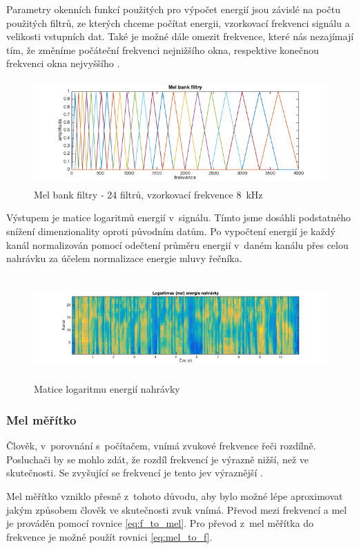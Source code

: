 Parametry okenních funkcí použitých pro výpočet energií jsou závislé na počtu použitých filtrů, ze kterých chceme počítat energii, vzorkovací frekvenci signálu a velikosti vstupních dat. Také je možné dále omezit frekvence, které nás nezajímají tím, že změníme počáteční frekvenci nejnižšího okna, respektive konečnou frekvenci okna nejvyššího
.
\begin{figure}[H]
	\centering
		\includegraphics[height=4cm]{obrazky-figures/mel_bank_filters.png}
        \caption{Mel bank filtry - 24 filtrů, vzorkovací frekvence 8~kHz}
\end{figure}

Výstupem je matice logaritmů energií v~signálu. Tímto jsme dosáhli podstatného snížení dimenzionality oproti původním datům. Po vypočtení energií je každý kanál normalizován pomocí odečtení průměru energií v~daném kanálu přes celou nahrávku za účelem normalizace energie mluvy řečníka.

\begin{figure}[H]
	\centering
		\includegraphics[height=4cm]{obrazky-figures/log_mel_power.png}
        \caption{Matice logaritmu energií nahrávky}
\end{figure}

\subsubsection{Mel měřítko}
Člověk, v~porovnání s~počítačem, vnímá zvukové frekvence řeči rozdílně. Posluchači by se mohlo zdát, že rozdíl frekvencí je výrazně nižší, než ve skutečnosti. Se zvyšující se frekvencí je tento jev výraznější \cite{1937ASAJ....8..185S}.

Mel měřítko vzniklo přesně z~tohoto důvodu, aby bylo možné lépe aproximovat jakým způsobem člověk ve skutečnosti zvuk vnímá. Převod mezi frekvencí a mel je prováděn pomocí rovnice \ref{eq:f_to_mel}. Pro převod z~mel měřítka do frekvence je možné použít rovnici \ref{eq:mel_to_f}.

